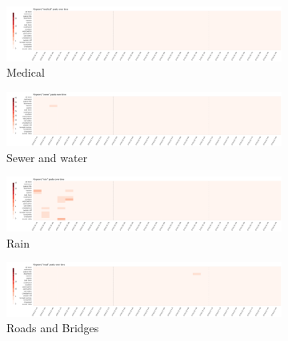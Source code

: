 \begin{figure}[!h]
    \centering
    \begin{subfigure}[!h]{0.24\textwidth}
        \centering
        \includegraphics[width=1.00\textwidth]{figs/cond_30h/cond_30h_medical.png}
        \caption{Medical}
        \label{fig:medical_30h}
    \end{subfigure}
    \begin{subfigure}[!h]{0.24\textwidth}
        \centering
        \includegraphics[width=1.00\textwidth]{figs/cond_30h/cond_30h_sewer.png}
        \caption{Sewer and water}
        \label{fig:sewer_30h}
    \end{subfigure}
    \begin{subfigure}[!h]{0.24\textwidth}
        \centering
        \includegraphics[width=1.00\textwidth]{figs/cond_30h/cond_30h_rain.png}
        \caption{Rain}
        \label{fig:rain_30h}
    \end{subfigure}
    \begin{subfigure}[!h]{0.24\textwidth}
        \centering
        \includegraphics[width=1.00\textwidth]{figs/cond_30h/cond_30h_road.png}
        \caption{Roads and Bridges}
        \label{fig:roads_30h}
    \end{subfigure}
    \begin{subfigure}[!h]{0.98\textwidth}
        \centering

\end{subfigure}
\end{figure}

